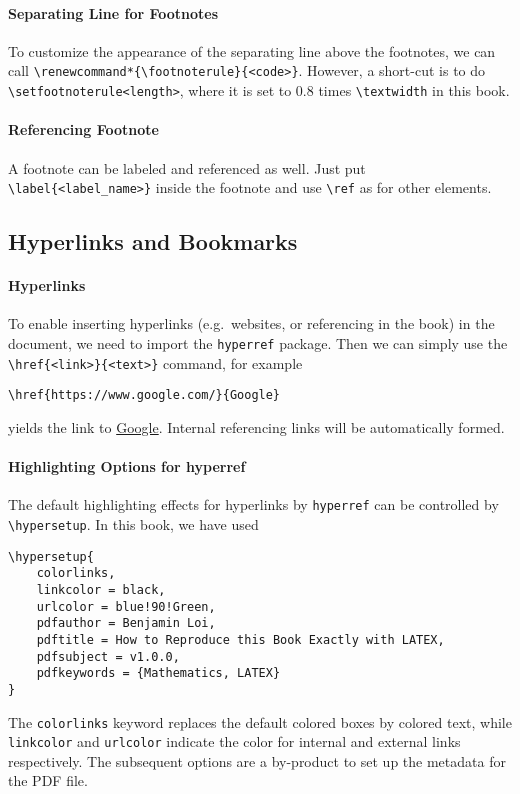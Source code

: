 \paragraph{Separating Line for Footnotes} 
To customize the appearance of the separating line above the footnotes, we can call \texttt{\textbackslash renewcommand*\{\textbackslash footnoterule\}\allowbreak\{<code>\}}. However, a short-cut is to do \texttt{\textbackslash setfootnoterule<length>}, where it is set to $0.8$ times \texttt{\textbackslash textwidth} in this book.

\paragraph{Referencing Footnote}
A footnote can be labeled and referenced as well. Just put \texttt{\textbackslash label\{<label\_name>\}} inside the footnote and use \texttt{\textbackslash ref} as for other elements.

\subsection{Hyperlinks and Bookmarks}

\paragraph{Hyperlinks} 
To enable inserting hyperlinks (e.g.\ websites, or referencing in the book) in the document, we need to import the \texttt{hyperref} package. Then we can simply use the \texttt{\textbackslash href\{<link>\}\allowbreak\{<text>\}} command, for example
\begin{lstlisting}
\href{https://www.google.com/}{Google}
\end{lstlisting}
yields the link to \href{https://www.google.com/}{Google}. Internal referencing links will be automatically formed.

\paragraph{Highlighting Options for hyperref} The default highlighting effects for hyperlinks by \texttt{hyperref} can be controlled by \texttt{\textbackslash hypersetup}. In this book, we have used
\begin{lstlisting}
\hypersetup{
    colorlinks,
    linkcolor = black,
    urlcolor = blue!90!Green,
    pdfauthor = Benjamin Loi,
    pdftitle = How to Reproduce this Book Exactly with LATEX,
    pdfsubject = v1.0.0,
    pdfkeywords = {Mathematics, LATEX}
}
\end{lstlisting}
The \texttt{colorlinks} keyword replaces the default colored boxes by colored text, while \texttt{linkcolor} and \texttt{urlcolor} indicate the color for internal and external links respectively. The subsequent options are a by-product to set up the metadata for the PDF file.

